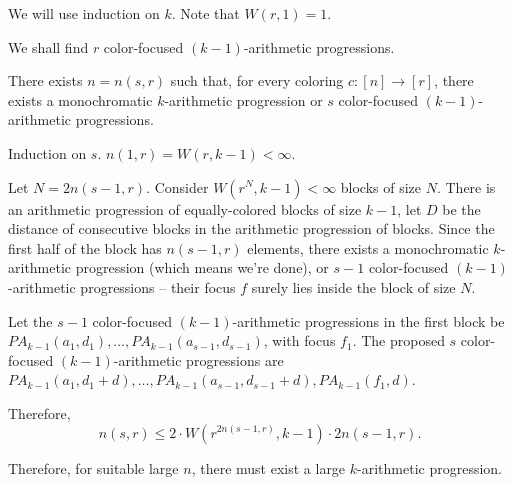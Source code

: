 \begin{dem}
	We will use induction on $k$. Note that $W(r, 1) = 1$.

	We shall find $r$ color-focused $(k-1)$-arithmetic progressions.
	\begin{lem}
		There exists $n = n(s, r)$ such that, for every coloring $c\colon [n] \to [r]$, there exists a monochromatic $k$-arithmetic progression or $s$ color-focused $(k-1)$-arithmetic progressions.
	\end{lem}
	\begin{dem}
		Induction on $s$. $n(1, r) = W(r, k-1) < \infty$.

		Let $N = 2n(s-1, r)$. Consider $W(r^N, k-1) < \infty$ blocks of size $N$. There is an arithmetic progression of equally-colored blocks of size $k-1$, let $D$ be the distance of consecutive blocks in the arithmetic progression of blocks. Since the first half of the block has $n(s-1, r)$ elements, there exists a monochromatic $k$-arithmetic progression (which means we're done), or $s-1$ color-focused $(k-1)$-arithmetic progressions -- their focus $f$ surely lies inside the block of size $N$.

		Let the $s-1$ color-focused $(k-1)$-arithmetic progressions in the first block be $PA_{k-1}(a_1, d_1), \dots, PA_{k-1}(a_{s-1}, d_{s-1})$, with focus $f_1$. The proposed $s$ color-focused $(k-1)$-arithmetic progressions are $PA_{k-1}(a_1, d_1 + d), \dots, PA_{k-1}(a_{s-1}, d_{s-1} + d), PA_{k-1}(f_1, d)$.

		Therefore,  \[
			n(s, r) \le 2 \cdot W(r^{2n(s-1, r)}, k-1) \cdot 2n(s-1, r).
		\]
	\end{dem}

	Therefore, for suitable large $n$, there must exist a large $k$-arithmetic progression.
\end{dem}
